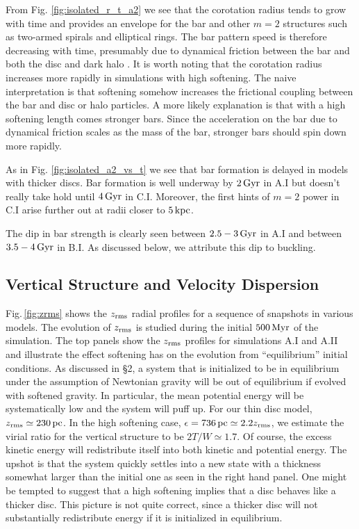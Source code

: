 From {Fig. \ref{fig:isolated_r_t_a2}} we see that the corotation radius
tends to grow with time and provides an envelope for the bar and other
$m=2$ structures such as two-armed spirals and elliptical rings.  The
bar pattern speed is therefore decreasing with time, presumably due to
dynamical friction between the bar and both the disc and dark halo
\citep{debattista1998, debattista2000}.  It is worth noting that the
corotation radius increases more rapidly in simulations with high
softening.  The naive interpretation is that softening somehow
increases the frictional coupling between the bar and disc or halo
particles.  A more likely explanation is that with a high softening
length comes stronger bars.  Since the acceleration on the bar due to
dynamical friction scales as the mass of the bar, stronger bars should
spin down more rapidly.

As in Fig. \ref{fig:isolated_a2_vs_t} we see that bar formation
is delayed in models with thicker discs.  Bar formation is 
well underway by $2\,{\rm Gyr}$ in A.I but doesn't really take hold
until $4\,{\rm Gyr}$ in C.I.  Moreover, the first hints of $m=2$ power
in C.I arise further out at radii closer to $5\,{\rm kpc}$.  

The dip in bar strength is clearly seen between $2.5-3\,{\rm Gyr}$ in
A.I and between $3.5-4\,{\rm Gyr}$ in B.I.  As discussed below, we
attribute this dip to buckling.

\subsection{Vertical Structure and Velocity Dispersion}


{Fig.\,\ref{fig:zrms} shows the
$z_{\rm rms}$ radial profiles for a sequence of snapshots
in various models.  
The  evolution
of $z_{\rm rms}$ is studied during the initial $500\,{\rm Myr}$ of the simulation.  The
top panels show the $z_{\rm rms}$ profiles for simulations A.I and A.II and
illustrate the effect softening has on the evolution from
``equilibrium'' initial conditions.  As discussed in \S2,} a
system that is initialized to be in equilibrium under the assumption
of Newtonian gravity will be out of equilibrium if evolved with
softened gravity.  In particular, the mean potential energy will be
systematically low and the system will puff up.  For our thin disc
model, $z_{\rm rms}\simeq 230\,{\rm pc}$.  In the high softening case,
$\epsilon = 736\,{\rm pc} \simeq 2.2z_{\rm rms}$, we estimate the virial ratio
for the vertical structure to be $2T/W\simeq 1.7$.  Of course, the
excess kinetic energy will redistribute itself into both kinetic and
potential energy.  The upshot is that the system quickly settles into
a new state with a thickness somewhat larger than the initial one as
seen in the right hand panel. {One might be tempted to suggest
that a high softening implies that a disc behaves like a thicker disc.
This picture is not quite correct, since a thicker disc will not 
substantially redistribute energy if it is initialized in equilibrium.}

